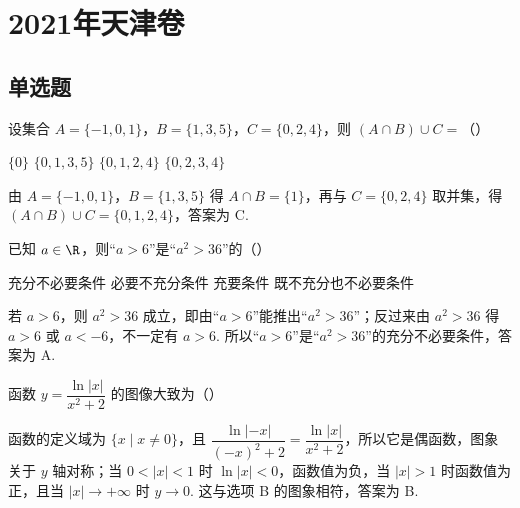
\chapter{2021年天津卷}

\section{单选题}

\begin{problem}
设集合 \( A=\{-1,0,1\} \)，\( B=\{1,3,5\} \)，\( C=\{0,2,4\} \)，则 \( \left( A\cap B \right)\cup C= \)（\quad）

\choices
    {\(\{0\}\)}
    {\(\{0,1,3,5\}\)}
    {\(\{0,1,2,4\}\)}
    {\(\{0,2,3,4\}\)}
\end{problem}


\begin{solution}
由 \(A=\{-1,0,1\}\)，\(B=\{1,3,5\}\) 得 \(A\cap B=\{1\}\)，再与 \(C=\{0,2,4\}\) 取并集，得 \(\left( A\cap B \right)\cup C=\{0,1,2,4\}\)，答案为 C.
\end{solution}

\begin{problem}
已知 \( a\in \R \)，则“\( a>6 \)”是“\( a^2>36 \)”的（\quad）

\choices
    {充分不必要条件}
    {必要不充分条件}
    {充要条件}
    {既不充分也不必要条件}
\end{problem}


\begin{solution}
若 \(a>6\)，则 \(a^2>36\) 成立，即由“\(a>6\)”能推出“\(a^2>36\)”；反过来由 \(a^2>36\) 得 \(a>6\) 或 \(a<-6\)，不一定有 \(a>6\). 所以“\(a>6\)”是“\(a^2>36\)”的充分不必要条件，答案为 A.
\end{solution}

\begin{problem}
函数 \( y=\dfrac{\ln |x|}{x^2+2} \) 的图像大致为（\quad）

    {}
    {}
    {}
\end{problem}


\begin{solution}
函数的定义域为 \(\{x\mid x\ne0\}\)，且 \(\dfrac{\ln|-x|}{(-x)^2+2}=\dfrac{\ln|x|}{x^2+2}\)，所以它是偶函数，图象关于 \(y\) 轴对称；当 \(0<|x|<1\) 时 \(\ln|x|<0\)，函数值为负，当 \(|x|>1\) 时函数值为正，且当 \(|x|\to+\infty\) 时 \(y\to0\). 这与选项 B 的图象相符，答案为 B.
\end{solution}

